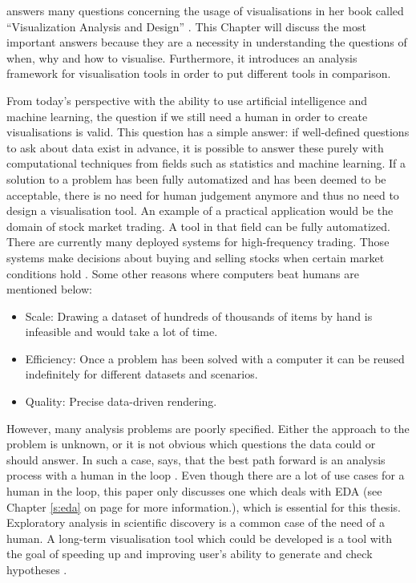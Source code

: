 \citeauthor{Munzner2014} answers many questions concerning the usage of visualisations in her book called ``Visualization Analysis and Design'' . This Chapter will discuss the most important answers because they are a necessity in understanding the questions of when, why and how to visualise. Furthermore, it introduces an analysis framework for visualisation tools in order to
put different tools in comparison.

From today's perspective with the ability to use artificial intelligence and machine learning, the question if we still need a human in order to create visualisations is valid. This question has a simple answer: if well-defined questions to ask about data exist in advance, it is possible to answer these purely with computational techniques from fields such as statistics and machine learning. If a solution to a problem has been fully automatized and has been deemed to be acceptable, there is no need for human judgement anymore and thus no need to design a visualisation tool. An example of a practical application would be the domain of stock market trading. A tool in that field can be fully automatized. There are currently many deployed systems for high-frequency trading. Those systems make decisions about buying and selling stocks when certain market conditions hold . Some other reasons where computers beat humans are mentioned below:
\begin{itemize}
\item Scale: Drawing a dataset of hundreds of thousands of items by hand is infeasible and would take a lot of time.
\item Efficiency: Once a problem has been solved with a computer it can be reused  indefinitely for different datasets and scenarios.
\item Quality: Precise data-driven rendering.
\end{itemize}
However, many analysis problems are poorly specified. Either the approach to the problem is unknown, or it is not obvious which questions the data could or should answer. In such a case, \citeauthor{Munzner2014} says, that the best path forward is an analysis process with a human in the loop . Even though there are a lot of use cases for a human in the loop, this paper only discusses one which deals with \ac{EDA} (see Chapter \ref{s:eda} on page \pageref{s:eda} for more information.), which is essential for this thesis. Exploratory analysis in scientific discovery is a common case of the need of a human. A long-term visualisation tool which could be developed is a tool with the goal of speeding up and improving user's ability to generate and check hypotheses .

